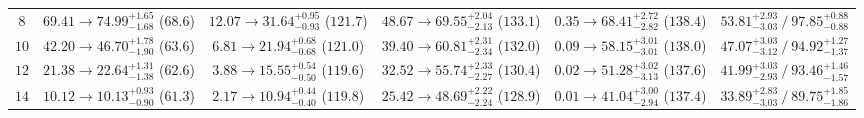 \documentclass[10pt,a4paper]{article}
\begin{document}
\begin{table}[!htbp]
{\begin{tabular}{@{}cccccc@{}}
$8$ & $69.41 \rightarrow \mathbf{74.99}^{+1.65}_{-1.68}$ ($68.6$) & $12.07 \rightarrow 31.64^{+0.95}_{-0.93}$ ($121.7$) & $48.67 \rightarrow 69.55^{+2.04}_{-2.13}$ ($133.1$) & $0.35 \rightarrow 68.41^{+2.72}_{-2.82}$ ($138.4$) & $53.81^{+2.93}_{-3.03}\ /\ 97.85^{+0.88}_{-0.88}$ \\
$10$ & $42.20 \rightarrow \mathbf{46.70}^{+1.78}_{-1.90}$ ($63.6$) & $6.81 \rightarrow 21.94^{+0.68}_{-0.68}$ ($121.0$) & $39.40 \rightarrow \mathbf{60.81}^{+2.31}_{-2.34}$ ($132.0$) & $0.09 \rightarrow 58.15^{+3.01}_{-3.01}$ ($138.0$) & $47.07^{+3.03}_{-3.12}\ /\ 94.92^{+1.27}_{-1.37}$ \\
$12$ & $21.38 \rightarrow \mathbf{22.64}^{+1.31}_{-1.38}$ ($62.6$) & $3.88 \rightarrow 15.55^{+0.54}_{-0.50}$ ($119.6$) & $32.52 \rightarrow \mathbf{55.74}^{+2.33}_{-2.27}$ ($130.4$) & $0.02 \rightarrow 51.28^{+3.02}_{-3.13}$ ($137.6$) & $41.99^{+3.03}_{-2.93}\ /\ 93.46^{+1.46}_{-1.57}$ \\
$14$ & $10.12 \rightarrow 10.13^{+0.93}_{-0.90}$ ($61.3$) & $2.17 \rightarrow \mathbf{10.94}^{+0.44}_{-0.40}$ ($119.8$) & $25.42 \rightarrow \mathbf{48.69}^{+2.22}_{-2.24}$ ($128.9$) & $0.01 \rightarrow 41.04^{+3.00}_{-2.94}$ ($137.4$) & $33.89^{+2.83}_{-3.03}\ /\ 89.75^{+1.85}_{-1.86}$ \\
\bottomrule
\end{tabular}%
}
\end{table}
\end{document}
